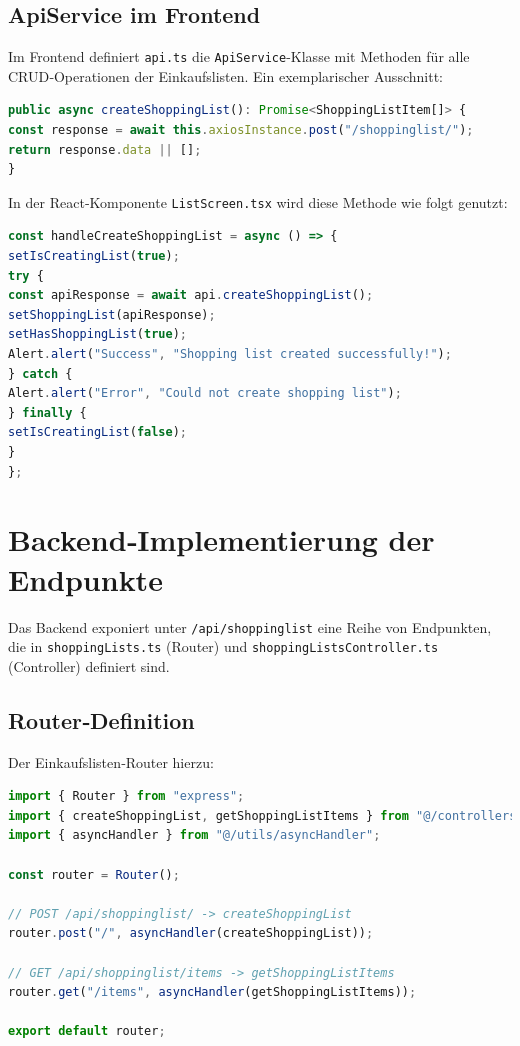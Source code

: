 \documentclass[12pt, a4paper]{report} %
\begin{document}
\subsection{ApiService im Frontend}
Im Frontend definiert \texttt{api.ts} die \texttt{ApiService}-Klasse mit Methoden für alle CRUD‑Operationen der Einkaufslisten. Ein exemplarischer Ausschnitt:

\begin{lstlisting}[language=TypeScript,caption={Definition der \texttt{createShoppingList}-Methode im \texttt{ApiService}}]
public async createShoppingList(): Promise<ShoppingListItem[]> {
const response = await this.axiosInstance.post("/shoppinglist/");
return response.data || [];
}
\end{lstlisting}

In der React‑Komponente \texttt{ListScreen.tsx} wird diese Methode wie folgt genutzt:

\begin{lstlisting}[language=TypeScript,caption={Aufruf von \texttt{createShoppingList} im Frontend}]
const handleCreateShoppingList = async () => {
setIsCreatingList(true);
try {
const apiResponse = await api.createShoppingList();
setShoppingList(apiResponse);
setHasShoppingList(true);
Alert.alert("Success", "Shopping list created successfully!");
} catch {
Alert.alert("Error", "Could not create shopping list");
} finally {
setIsCreatingList(false);
}
};
\end{lstlisting}

\section{Backend‑Implementierung der Endpunkte}
Das Backend exponiert unter \texttt{/api/shoppinglist} eine Reihe von Endpunkten, die in \texttt{shoppingLists.ts} (Router) und \texttt{shoppingListsController.ts} (Controller) definiert sind.

\subsection{Router‑Definition}
Der Einkaufslisten‑Router hierzu:

\begin{lstlisting}[language=TypeScript,caption={Routing des Einkaufslisten‑Endpoints im Backend (\texttt{shoppingLists.ts})}]
import { Router } from "express";
import { createShoppingList, getShoppingListItems } from "@/controllers/shoppingListsController";
import { asyncHandler } from "@/utils/asyncHandler";

const router = Router();

// POST /api/shoppinglist/ -> createShoppingList
router.post("/", asyncHandler(createShoppingList));

// GET /api/shoppinglist/items -> getShoppingListItems
router.get("/items", asyncHandler(getShoppingListItems));

export default router;
\end{lstlisting}
\end{document}
